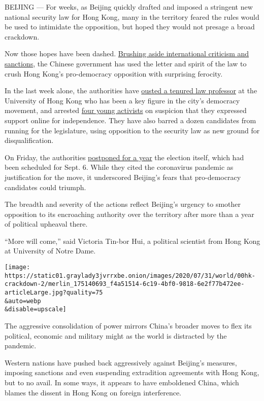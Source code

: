 BEIJING --- For weeks, as Beijing quickly drafted and imposed a
stringent new national security law for Hong Kong, many in the territory
feared the rules would be used to intimidate the opposition, but hoped
they would not presage a broad crackdown.

Now those hopes have been dashed.
\href{https://www.nytimes3xbfgragh.onion/2020/07/15/world/asia/china-trump-hong-kong.html}{Brushing
aside international criticism and sanctions}, the Chinese government has
used the letter and spirit of the law to crush Hong Kong's pro-democracy
opposition with surprising ferocity.

In the last week alone, the authorities have
\href{https://www.nytimes3xbfgragh.onion/2020/07/28/world/asia/benny-tai-hong-kong-university.html}{ousted
a tenured law professor} at the University of Hong Kong who has been a
key figure in the city's democracy movement, and arrested
\href{https://www.nytimes3xbfgragh.onion/2020/07/29/world/asia/hong-kong-arrests-security-law.html}{four
young activists} on suspicion that they expressed support online for
independence. They have also barred a dozen candidates from running for
the legislature, using opposition to the security law as new ground for
disqualification.

On Friday, the authorities
\href{https://www.nytimes3xbfgragh.onion/2020/07/31/world/asia/hong-kong-election-delayed.html}{postponed
for a year} the election itself, which had been scheduled for Sept. 6.
While they cited the coronavirus pandemic as justification for the move,
it underscored Beijing's fears that pro-democracy candidates could
triumph.

The breadth and severity of the actions reflect Beijing's urgency to
smother opposition to its encroaching authority over the territory after
more than a year of political upheaval there.

``More will come,'' said Victoria Tin-bor Hui, a political scientist
from Hong Kong at University of Notre Dame.

\texttt{[image: https://static01.graylady3jvrrxbe.onion/images/2020/07/31/world/00hk-crackdown-2/merlin\_175140693\_f4a51514-6c19-4bf0-9818-6e2f77b472ee-articleLarge.jpg?quality=75\\\&auto=webp\\\&disable=upscale]}

The aggressive consolidation of power mirrors China's broader moves to
flex its political, economic and military might as the world is
distracted by the pandemic.

Western nations have pushed back aggressively against Beijing's
measures, imposing sanctions and even suspending extradition agreements
with Hong Kong, but to no avail. In some ways, it appears to have
emboldened China, which blames the dissent in Hong Kong on foreign
interference.

